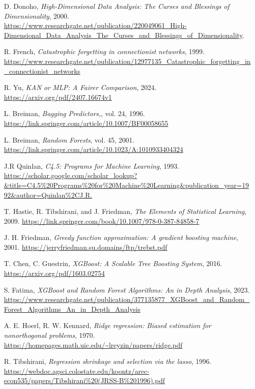 \documentclass[a4paper,12pt]{report}
\begin{document}
\begin{thebibliography}{99}
		D. Donoho, \emph{High-Dimensional Data Analysis: The Curses and Blessings of Dimensionality}, 2000. \url{https://www.researchgate.net/publication/220049061_High-Dimensional_Data_Analysis_The_Curses_and_Blessings_of_Dimensionality}.
		
		R. French, \emph{Catastrophic forgetting in connectionist networks}, 1999. \url{https://www.researchgate.net/publication/12977135_Catastrophic_forgetting_in_connectionist_networks}
		
		R. Yu, \emph{KAN or MLP: A Fairer Comparison}, 2024. \url{https://arxiv.org/pdf/2407.16674v1}
		
		L. Breiman, \emph{Bagging Predictors,}, vol. 24, 1996. \url{https://link.springer.com/article/10.1007/BF00058655}
		
		L. Breiman, \emph{Random Forests}, vol. 45, 2001. \url{https://link.springer.com/article/10.1023/A:1010933404324}
		
		J.R Quinlan, \emph{C4.5: Programs for Machine Learning}, 1993. \url{https://scholar.google.com/scholar_lookup?&title=C4.5%20Programs%20for%20Machine%20Learning&publication_year=1992&author=Quinlan%2CJ.R.}
		
		T. Hastie, R. Tibshirani, and J. Friedman, \emph{The Elements of Statistical Learning}, 2009. \url{https://link.springer.com/book/10.1007/978-0-387-84858-7}
		
		J. H. Friedman, \emph{Greedy function approximation: A gradient boosting machine}, 2001. \url{https://jerryfriedman.su.domains/ftp/trebst.pdf}
		
		T. Chen, C. Guestrin, \emph{XGBoost: A Scalable Tree Boosting System}, 2016. \url{https://arxiv.org/pdf/1603.02754}
		
		S. Fatima, \emph{XGBoost and Random Forest Algorithms: An in Depth Analysis}, 2023. \url{https://www.researchgate.net/publication/377135877_XGBoost_and_Random_Forest_Algorithms_An_in_Depth_Analysis}
		
		A. E. Hoerl, R. W. Kennard, \emph{Ridge regression: Biased estimation for nonorthogonal problems}, 1970. \url{https://homepages.math.uic.edu/~lreyzin/papers/ridge.pdf}
		
		R. Tibshirani, \emph{Regression shrinkage and selection via the lasso}, 1996. \url{https://webdoc.agsci.colostate.edu/koontz/arec-econ535/papers/Tibshirani%20(JRSS-B%201996).pdf}
		

\end{thebibliography}
\end{document}

